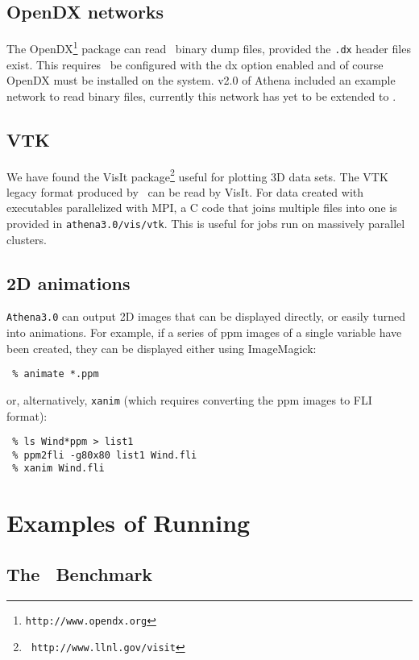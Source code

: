 \subsection{OpenDX networks}

The OpenDX\footnote{{\tt http://www.opendx.org}} package can
read \ath\ binary dump files, provided the {\tt .dx} header files exist.
This requires \ath\ be configured with the dx option enabled and of
course OpenDX must be installed on the system.  v2.0 of Athena included
an example network to read binary files, currently this network
has yet to be extended to \ath.

\subsection{VTK}

We have found the VisIt package\footnote{{\tt
http://www.llnl.gov/visit}} useful for plotting 3D data sets.  The VTK legacy
format produced by \ath\ can be read by VisIt.  For data created with
executables parallelized with MPI, a C code that joins multiple files into
one is provided in {\tt athena3.0/vis/vtk}.  This is useful for jobs run
on massively parallel clusters.

\subsection{2D animations}

{\tt Athena3.0} can output 2D images that can be displayed directly, or easily
turned into animations.  For example, if a series of ppm images of a single
variable have been created, they can be displayed either using
ImageMagick:
\begin{verbatim}
 % animate *.ppm
\end{verbatim}
or, alternatively, {\tt xanim} (which requires converting the ppm images to FLI
format):
\begin{verbatim}
 % ls Wind*ppm > list1
 % ppm2fli -g80x80 list1 Wind.fli
 % xanim Wind.fli
\end{verbatim}

\section{Examples of Running \ath}

\subsection{The \ath\ Benchmark}

